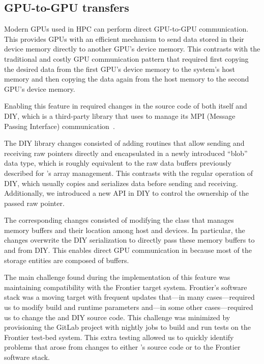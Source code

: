 \subsection{GPU-to-GPU transfers}

Modern GPUs used in HPC can perform direct GPU-to-GPU communication. This provides GPUs with an efficient mechanism to send data stored in their device memory directly to another GPU's device memory. This contrasts with the traditional and costly GPU communication pattern that required first copying the desired data from the first GPU's device memory to the system's host memory and then copying the data again from the host memory to the second GPU's device memory.

Enabling this feature in \vtkm required changes in the source code of both \vtkm itself and DIY, which is a third-party library that \vtkm uses to manage its MPI (Message Passing Interface) communication~\citep{Peterka2011,Morozov2016}.

The DIY library changes consisted of adding routines that allow sending and receiving raw pointers directly and encapsulated in a newly introduced ``blob'' data type, which is roughly equivalent to the raw data buffers previously described for \vtkm's array management.
This contrasts with the regular operation of DIY, which usually copies and serializes data before sending and receiving.
Additionally, we introduced a new API in DIY to control the ownership of the passed raw pointer.

The corresponding \vtkm changes consisted of modifying the \vtkm class that manages memory buffers and their location among host and devices.
In particular, the changes overwrite the DIY serialization to directly pass these memory buffers to and from DIY.
This enables direct GPU communication in \vtkm because most of the \vtkm storage entities are composed of \vtkm buffers. 

The main challenge found during the implementation of this feature was maintaining compatibility with the Frontier target system.
Frontier's software stack was a moving target with frequent updates that---in many cases---required us to modify build and runtime parameters and---in some other cases---required us to change the \vtkm and DIY source code.
This challenge was minimized by provisioning the \vtkm GitLab project with nightly jobs to build and run tests on the Frontier test-bed system.
This extra testing allowed us to quickly identify problems that arose from changes to either \vtkm's source code or to the Frontier software stack.
